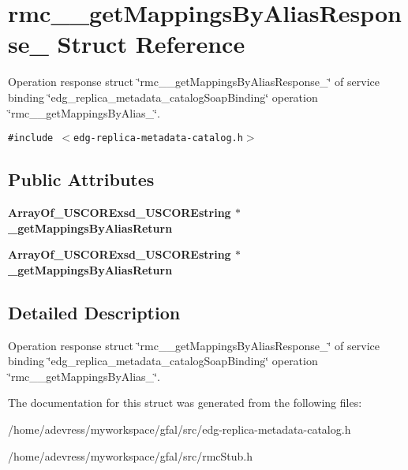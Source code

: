 \section{rmc\_\-\_\-get\-Mappings\-By\-Alias\-Response\_\- Struct Reference}
\label{structrmc____getMappingsByAliasResponse__}
Operation response struct \char`\"{}rmc\_\-\_\-get\-Mappings\-By\-Alias\-Response\_\-\char`\"{} of service binding \char`\"{}edg\_\-replica\_\-metadata\_\-catalog\-Soap\-Binding\char`\"{} operation \char`\"{}rmc\_\-\_\-get\-Mappings\-By\-Alias\_\-\char`\"{}.  


{\tt \#include $<$edg-replica-metadata-catalog.h$>$}

\subsection*{Public Attributes}
\begin{CompactItemize}
\item 
\bf{Array\-Of\_\-USCORExsd\_\-USCOREstring} $\ast$ \textbf{\_\-get\-Mappings\-By\-Alias\-Return}\label{structrmc____getMappingsByAliasResponse___8d826c1dba4f1da2cbb2d0c8ea674492}

\item 
\bf{Array\-Of\_\-USCORExsd\_\-USCOREstring} $\ast$ \textbf{\_\-get\-Mappings\-By\-Alias\-Return}\label{structrmc____getMappingsByAliasResponse___8d826c1dba4f1da2cbb2d0c8ea674492}

\end{CompactItemize}


\subsection{Detailed Description}
Operation response struct \char`\"{}rmc\_\-\_\-get\-Mappings\-By\-Alias\-Response\_\-\char`\"{} of service binding \char`\"{}edg\_\-replica\_\-metadata\_\-catalog\-Soap\-Binding\char`\"{} operation \char`\"{}rmc\_\-\_\-get\-Mappings\-By\-Alias\_\-\char`\"{}. 



The documentation for this struct was generated from the following files:\begin{CompactItemize}
\item 
/home/adevress/myworkspace/gfal/src/edg-replica-metadata-catalog.h\item 
/home/adevress/myworkspace/gfal/src/rmc\-Stub.h\end{CompactItemize}
